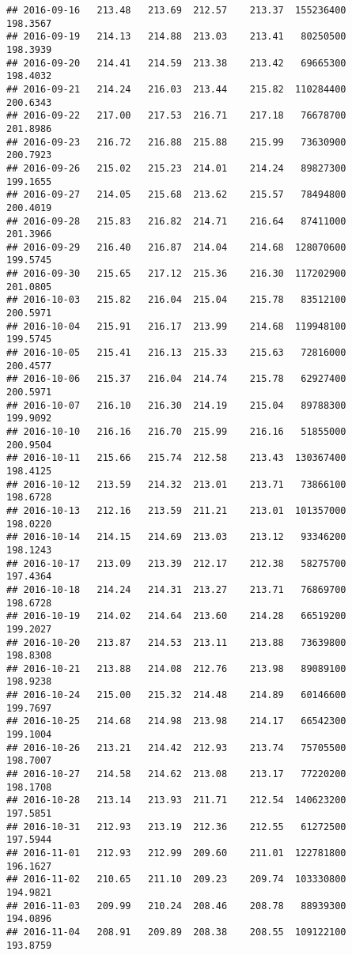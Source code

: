 \documentclass[
]{article}
\begin{document}
\begin{verbatim}
## 2016-09-16   213.48   213.69  212.57    213.37  155236400     198.3567
## 2016-09-19   214.13   214.88  213.03    213.41   80250500     198.3939
## 2016-09-20   214.41   214.59  213.38    213.42   69665300     198.4032
## 2016-09-21   214.24   216.03  213.44    215.82  110284400     200.6343
## 2016-09-22   217.00   217.53  216.71    217.18   76678700     201.8986
## 2016-09-23   216.72   216.88  215.88    215.99   73630900     200.7923
## 2016-09-26   215.02   215.23  214.01    214.24   89827300     199.1655
## 2016-09-27   214.05   215.68  213.62    215.57   78494800     200.4019
## 2016-09-28   215.83   216.82  214.71    216.64   87411000     201.3966
## 2016-09-29   216.40   216.87  214.04    214.68  128070600     199.5745
## 2016-09-30   215.65   217.12  215.36    216.30  117202900     201.0805
## 2016-10-03   215.82   216.04  215.04    215.78   83512100     200.5971
## 2016-10-04   215.91   216.17  213.99    214.68  119948100     199.5745
## 2016-10-05   215.41   216.13  215.33    215.63   72816000     200.4577
## 2016-10-06   215.37   216.04  214.74    215.78   62927400     200.5971
## 2016-10-07   216.10   216.30  214.19    215.04   89788300     199.9092
## 2016-10-10   216.16   216.70  215.99    216.16   51855000     200.9504
## 2016-10-11   215.66   215.74  212.58    213.43  130367400     198.4125
## 2016-10-12   213.59   214.32  213.01    213.71   73866100     198.6728
## 2016-10-13   212.16   213.59  211.21    213.01  101357000     198.0220
## 2016-10-14   214.15   214.69  213.03    213.12   93346200     198.1243
## 2016-10-17   213.09   213.39  212.17    212.38   58275700     197.4364
## 2016-10-18   214.24   214.31  213.27    213.71   76869700     198.6728
## 2016-10-19   214.02   214.64  213.60    214.28   66519200     199.2027
## 2016-10-20   213.87   214.53  213.11    213.88   73639800     198.8308
## 2016-10-21   213.88   214.08  212.76    213.98   89089100     198.9238
## 2016-10-24   215.00   215.32  214.48    214.89   60146600     199.7697
## 2016-10-25   214.68   214.98  213.98    214.17   66542300     199.1004
## 2016-10-26   213.21   214.42  212.93    213.74   75705500     198.7007
## 2016-10-27   214.58   214.62  213.08    213.17   77220200     198.1708
## 2016-10-28   213.14   213.93  211.71    212.54  140623200     197.5851
## 2016-10-31   212.93   213.19  212.36    212.55   61272500     197.5944
## 2016-11-01   212.93   212.99  209.60    211.01  122781800     196.1627
## 2016-11-02   210.65   211.10  209.23    209.74  103330800     194.9821
## 2016-11-03   209.99   210.24  208.46    208.78   88939300     194.0896
## 2016-11-04   208.91   209.89  208.38    208.55  109122100     193.8759

\end{verbatim}
\end{document}
